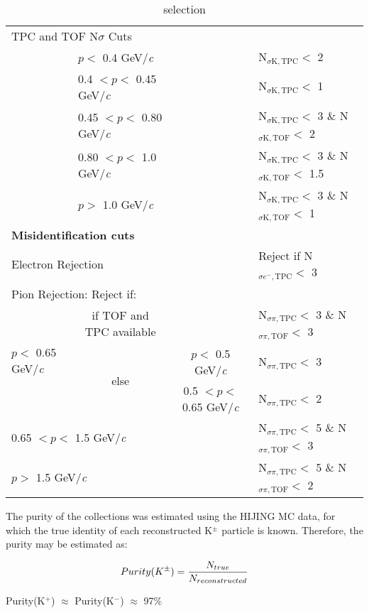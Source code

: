 \documentclass[/home/jesse/Analysis/FemtoAnalysis/AnalysisNotes/AnalysisNoteJBuxton.tex]{subfiles}
\begin{document}
\begin{table}[htbp]
\begin{adjustwidth}{-1in}{-1in}
\begin{tabular}{lc|c|l}
   \multicolumn{4}{l}{TPC and TOF N$\sigma$ Cuts} \\
   \cline{2-4}
    & \multicolumn{1}{l}{$p <$ 0.4 GeV/\textit{c}} &  & N$_{\sigma \mathrm{K,TPC}} <$ 2 \\
   \cline{2-4}
    & \multicolumn{1}{l}{0.4 $< p <$ 0.45 GeV/\textit{c}} & & N$_{\sigma \mathrm{K,TPC}} <$ 1 \\
   \cline{2-4}     
    & \multicolumn{1}{l}{0.45 $< p <$ 0.80 GeV/\textit{c}} & & N$_{\sigma \mathrm{K,TPC}} <$ 3 \& N$_{\sigma \mathrm{K,TOF}} <$ 2 \\ 
   \cline{2-4}
    & \multicolumn{1}{l}{0.80 $< p <$ 1.0 GeV/\textit{c}} & & N$_{\sigma \mathrm{K,TPC}} <$ 3 \& N$_{\sigma \mathrm{K,TOF}} <$ 1.5 \\ 
   \cline{2-4}
    & \multicolumn{1}{l}{$p >$ 1.0 GeV/\textit{c}} & & N$_{\sigma \mathrm{K,TPC}} <$ 3 \& N$_{\sigma \mathrm{K,TOF}} <$ 1 \\ 
   \hline
   \multicolumn{4}{l}{\textbf{Misidentification cuts}} \\
   \hline
   \multicolumn{3}{l|}{Electron Rejection} & Reject if N$_{\sigma e^{-},\mathrm{TPC}} < $ 3 \\
   \hline
   \multicolumn{4}{l}{Pion Rejection:  Reject if:} \\
   \hline
   \multirow{3}{*}{$p <$ 0.65 GeV/\textit{c}} & if TOF and TPC available & \multicolumn{1}{c}{} & N$_{\sigma \pi,\mathrm{TPC}} <$ 3 \& N$_{\sigma \pi,\mathrm{TOF}} <$ 3 \\
   \cline{2-4}
    & \multirow{2}{*}{else} & $p <$ 0.5 GeV/\textit{c} & N$_{\sigma \pi,\mathrm{TPC}} <$ 3 \\
   \cline{3-4}
    &  & 0.5 $< p <$ 0.65 GeV/\textit{c} & N$_{\sigma \pi,\mathrm{TPC}} <$ 2 \\
   \cline{2-4}
   \multicolumn{3}{l|}{0.65 $< p <$ 1.5 GeV/\textit{c}} & N$_{\sigma \pi,\mathrm{TPC}} <$ 5 \& N$_{\sigma \pi,\mathrm{TOF}} <$ 3 \\
   \cline{2-4}
   \multicolumn{3}{l|}{$p >$ 1.5 GeV/\textit{c}} & N$_{\sigma \pi,\mathrm{TPC}} <$ 5 \& N$_{\sigma \pi,\mathrm{TOF}} <$ 2 \\
   \hline
  \end{tabular}
 \caption{\Kpm selection}
 \label{tab:KchCuts} 
 \end{adjustwidth}
\end{table}
 
 

The purity of the \Kpm collections was estimated using the HIJING MC data, for which the true identity of each reconstructed K$^{\pm}$ particle is known.  Therefore, the purity may be estimated as:

\begin{equation}
 Purity(K^{\pm}) = \frac{N_{true}}{N_{reconstructed}} \\
\label{eqn:KchPurity}
\end{equation}

Purity(K$^{+}$) $\approx$ Purity(K$^{-}$) $\approx$ 97\%
\end{document}
